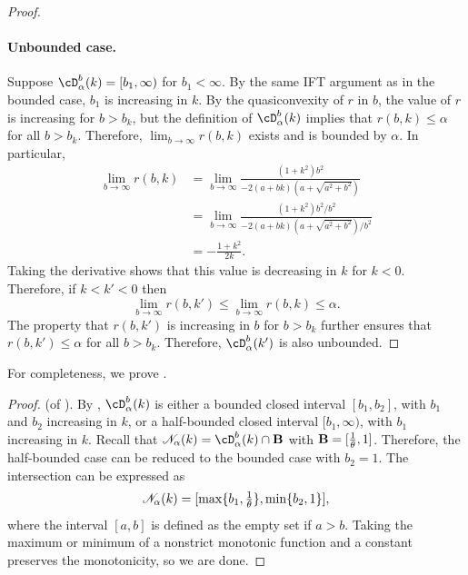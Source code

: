 \begin{proof}
	\paragraph{Unbounded case.}
	Suppose $\bdomain_\alpha(k) = [b_1, \infty)$ for $b_1 < \infty$.
	By the same IFT argument as in the bounded case, $b_1$ is increasing in $k$.
	By the quasiconvexity of $r$ in $b$,
	the value of $r$ is increasing for $b  > b_k$,
	but the definition of $\bdomain_\alpha(k)$ implies that
	$r(b, k) \leq \alpha$ for all $b > b_k$.
	Therefore, $\lim_{b \to \infty} r(b, k)$ exists
	and is bounded by $\alpha$.
	In particular,
	\begin{equation*}
		\begin{split}
			\lim_{b \to \infty} r(b, k)
			&=
			\lim_{b \to \infty}
			\frac{
				(1 + k^2) b^2
			}{
				-2(a + bk)(a + \sqrt{a^2 + b^2})
			}
			\\ &=
			\lim_{b \to \infty}
			\frac{
				(1 + k^2) b^2 / b^2
			}{
				-2(a + bk)(a + \sqrt{a^2 + b^2}) / b^2
			}
			\\ &=
			-
			\frac{
				1 + k^2
			}{
				2k
			}.
		\end{split}
	\end{equation*}
	Taking the derivative shows that this value is decreasing in $k$ for $k < 0$.
	Therefore, if $k < k' < 0$ then
	\[
		\lim_{b \to \infty} r(b, k') \leq \lim_{b \to \infty} r(b, k) \leq \alpha.
	\]
	The property that $r(b, k')$ is increasing in $b$ for $b > b_k$
	further ensures that
	$r(b, k') \leq \alpha$ for all $b > b_k$.
	Therefore, $\bdomain_\alpha(k')$ is also unbounded.
\end{proof}

\noindent For completeness, we prove .

\quad

\begin{proof} (of ).
	By ,
	$\bdomain_\alpha(k)$ is either
	a bounded closed interval $[b_1, b_2]$,
		with $b_1$ and $b_2$ increasing in $k$, or
	a half-bounded closed interval $[b_1, \infty)$,
		with $b_1$ increasing in $k$.
	Recall that $\suboptneighb{\alpha}{k} = \bdomain_\alpha(k) \cap \Bset$
	with $\mathbf{B} = [\frac{1}{\theta}, 1]$.
	Therefore, the half-bounded case can be reduced to the bounded case with $b_2 = 1$.
	The intersection can be expressed as
	\[
		\mathscr{N}_{\alpha}(k) = [\max\{b_1, \textstyle \frac{1}{\theta}\}, \min\{b_2, 1\}],
	\]
	where the interval $[a, b]$ is defined as the empty set if $a > b$.
	Taking the maximum or minimum of a nonstrict monotonic function and a constant
	preserves the monotonicity, so we are done.
\end{proof}

